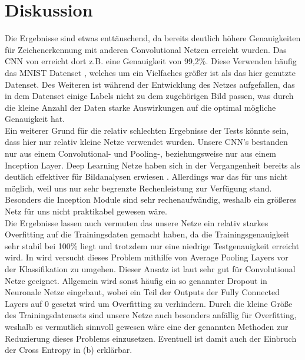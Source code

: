 \documentclass[runningheads,a4paper]{llncs}[2015/06/24]
\begin{document}
\section{Diskussion}\label{sec:Discussion}
Die Ergebnisse sind etwas enttäuschend, da bereits deutlich höhere Genauigkeiten für Zeichenerkennung mit anderen Convolutional Netzen erreicht wurden. Das CNN von \cite{99percent} erreicht dort z.B. eine Genauigkeit von 99,2\%. Diese Verwenden häufig das MNIST Datenset \cite{mnist}, welches um ein Vielfaches größer ist als das hier genutzte Datenset. Des Weiteren ist während der Entwicklung des Netzes aufgefallen, das in dem Datenset einige Labels nicht zu dem zugehörigen Bild passen, was durch die kleine Anzahl der Daten starke Auswirkungen auf die optimal mögliche Genauigkeit hat.\\
Ein weiterer Grund für die relativ schlechten Ergebnisse der Tests könnte sein, dass hier nur relativ kleine Netze verwendet wurden. Unsere CNN's bestanden nur aus einem Convolutional- und Pooling-, beziehungsweise nur aus einem Inception Layer. Deep Learning Netze haben sich in der Vergangenheit bereits als deutlich effektiver für Bildanalysen erwiesen \cite{deep_conv}. Allerdings war das für uns nicht möglich, weil uns nur sehr begrenzte Rechenleistung zur Verfügung stand. Besonders die Inception Module sind sehr rechenaufwändig, weshalb ein größeres Netz für uns nicht praktikabel gewesen wäre.\\
Die Ergebnisse lassen auch vermuten das unsere Netze ein relativ starkes Overfitting auf die Trainingsdaten gemacht haben, da die Trainingsgenauigkeit sehr stabil bei 100\% liegt und trotzdem nur eine niedrige Testgenauigkeit erreicht wird. In \cite{inception_paper} wird versucht dieses Problem mithilfe von Average Pooling Layers vor der Klassifikation zu umgehen. Dieser Ansatz ist laut \cite{average_pooling_paper} sehr gut für Convolutional Netze geeignet. Allgemein wird sonst häufig ein so genannter Dropout in Neuronale Netze eingebaut, wobei ein Teil der Outputs der Fully Connected Layers auf 0 gesetzt wird um Overfitting zu verhindern. Durch die kleine Größe des Trainingsdatensets sind unsere Netze auch besonders anfällig für Overfitting, weshalb es vermutlich sinnvoll gewesen wäre eine der genannten Methoden zur Reduzierung dieses Problems einzusetzen. Eventuell ist damit auch der Einbruch der Cross Entropy in  (b) erklärbar.\\
\end{document}
